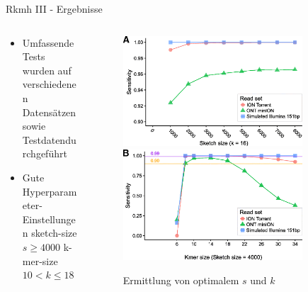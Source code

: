 \begin{frame}{Rkmh III - Ergebnisse}
    \begin{columns} %
        \begin{column}{.45\textwidth}
            \begin{itemize}
                \item Umfassende Tests wurden auf verschiedenen Datensätzen sowie Testdaten\footnotemark[1] durchgeführt \pause
                \item Gute Hyperparameter-Einstellungen sketch-size  $ s \geq 4000 $ k-mer-size $ 10 < k \leq 18 $ \pause
            \end{itemize}
        \end{column}
        \begin{column}{.50\textwidth}
            \begin{figure}[H]
                \centering
                \includegraphics[width=0.85\textwidth]{images/hyper-params-a.png} 
                \includegraphics[width=0.85\textwidth]{images/hyper-params-b.png}
                \caption{Ermittlung von optimalem $ s $ und $ k $ \cite{rkmhHyperParamImageA,rkmhHyperParamImageB}}
            \end{figure} 
        \end{column}
    \end{columns}        

\end{frame}